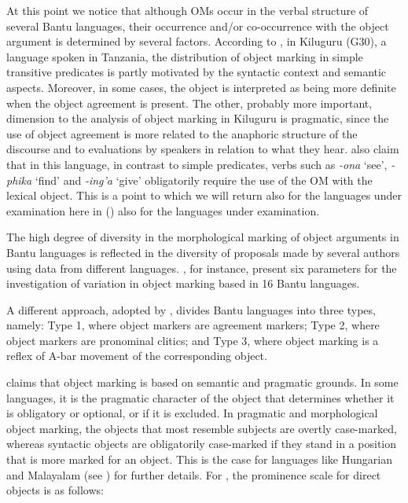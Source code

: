 \documentclass[output=paper]{langscibook}
\begin{document}
   \z 
\z

At this point we notice that although OMs occur in the verbal structure of several Bantu languages, their occurrence and/or co-occurrence with the object argument is determined by several factors. According to \citet{MartenRamadhani2001}, in Kiluguru (G30), a language spoken in Tanzania, the distribution of object marking in simple transitive predicates is partly motivated by the syntactic context and semantic aspects. Moreover, in some cases, the object is interpreted as being more definite when the object agreement is present. The other, probably more important, dimension to the analysis of object marking in Kiluguru is pragmatic, since the use of object agreement is more related to the anaphoric structure of the discourse and to evaluations by speakers in relation to what they hear. \citet{MartenRamadhani2001} also claim that in this language, in contrast to simple predicates, verbs such as \textit{{}-ona} ‘see’, \textit{{}-phika} ‘find’ and \textit{{}-ing’a} ‘give’ obligatorily require the use of the OM with the lexical object. This is a point to which we will return also for the languages under examination here in () also for the languages under examination. 

The high degree of diversity in the morphological marking of object arguments in Bantu languages is reflected in the diversity of proposals made by several authors using data from different languages. \citet{MartenKula2012}, for instance, present six parameters for the investigation of variation in object marking based in 16 Bantu languages. 

A different approach, adopted by \citet{Zeller2014}, divides Bantu languages into three types, namely: Type 1, where object markers are agreement markers; Type 2, where object markers are pronominal clitics; and Type 3, where object marking is a reflex of A-bar movement of the corresponding object.

\citet{Aissen2002} claims that object marking is based on semantic and pragmatic grounds. In some languages, it is the pragmatic character of the object that determines whether it is obligatory or optional, or if it is excluded. In pragmatic and morphological object marking, the objects that most resemble subjects are overtly case-marked, whereas syntactic objects are obligatorily case-marked if they stand in a position that is more marked for an object. This is the case for languages like Hungarian and Malayalam (see \citet{Aissen2002}) for further details. For \citet[437]{Aissen2002}, the prominence scale for direct objects is as follows:
\end{document}
